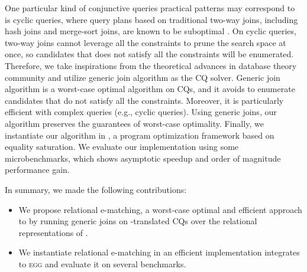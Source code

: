 One particular kind of conjunctive queries practical \ematching patterns may correspond to is cyclic queries, where query plans based on traditional two-way joins, including hash joins and merge-sort joins, are known to be suboptimal \citep{agm}.
On cyclic queries, two-way joins cannot leverage all the constraints to prune the search space at once, so candidates that does not satisfy all the constraints will be enumerated.
Therefore, we take inspirations from the theoretical advances in database theory community and utilize generic join algorithm as the CQ solver. 
Generic join algorithm is a worst-case optimal algorithm on CQs, and it avoids to enumerate candidates that do not satisfy all the constraints.
Moreover, it is particularly efficient with complex queries (e.g., cyclic queries). 
Using generic joins, our \ematching algorithm preserves the guarantees of worst-case optimality. 
Finally, we instantiate our algorithm in \egg \citep{egg}, a program optimization framework based on equality saturation. We evaluate our implementation using some microbenchmarks, which shows asymptotic speedup and order of magnitude performance gain.

In summary, we made the following contributions:
\begin{itemize}
    \item We propose relational e-matching, a worst-case optimal and efficient approach to \ematching by running generic joins on \ematching-translated CQs over the relational representations of \egraphs.
    \item We instantiate relational e-matching in an efficient implementation integrates to \textsc{egg} and evaluate it on several benchmarks.
\end{itemize}


